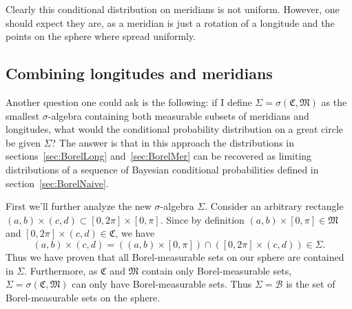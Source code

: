 \documentclass[twoside,a4paper]{report}
\theoremstyle{plain}
\theoremstyle{definition}
\theoremstyle{remark}
\numberwithin{equation}{chapter}
\DeclareMathOperator{\1}{\mathbbm{1}}
\newcommand{\B}{\mathcal{B}}
\begin{document}
Clearly this conditional distribution on meridians is not uniform. However, one should expect they are, as a meridian is just a rotation of a longitude and the points on the sphere where spread uniformly.

\subsection{Combining longitudes and meridians}
Another question one could ask is the following: if I define $\Sigma=\sigma(\mathfrak{C},\mathfrak{M})$ as the smallest $\sigma$-algebra containing both measurable subsets of meridians and longitudes, what would the conditional probability distribution on a great circle be given $\Sigma$? The answer is that in this approach the distributions in sections~\ref{sec:BorelLong} and~\ref{sec:BorelMer} can be recovered as limiting distributions of a sequence of Bayesian conditional probabilities defined in section~\ref{sec:BorelNaive}.

First we'll further analyze the new $\sigma$-algebra $\Sigma$. Consider an arbitrary rectangle $(a,b)\times(c,d)\subset[0,2\pi]\times[0,\pi]$. Since by definition $(a,b)\times[0,\pi]\in\mathfrak{M}$ and $[0,2\pi]\times(c,d)\in\mathfrak{C}$, we have
\[(a,b)\times(c,d)=\left((a,b)\times[0,\pi]\right)\cap\left([0,2\pi]\times(c,d)\right)\in\Sigma.\]
Thus we have proven that all Borel-measurable sets on our sphere are contained in $\Sigma$. Furthermore, as $\mathfrak{C}$ and $\mathfrak{M}$ contain only Borel-measurable sets, $\Sigma=\sigma(\mathfrak{C},\mathfrak{M})$ can only have Borel-measurable sets. Thus $\Sigma=\B$ is the set of Borel-measurable sets on the sphere.
\end{document}
